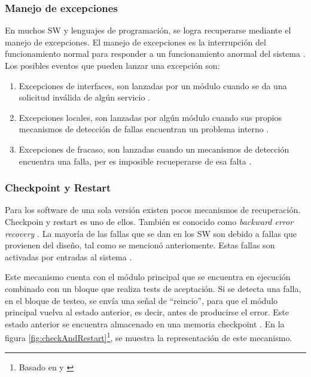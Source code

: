 \subsubsection{Manejo de excepciones}
En muchos \ac{SW} y lenguajes de programación, se logra recuperarse mediante el manejo de 
excepciones. El manejo de excepciones es la interrupción del funcionamiento normal para responder a 
un funcionamiento anormal del sistema \citep{SoftwareFaultToleranceATutorial}. Los posibles eventos 
que pueden lanzar una excepción son:
\begin{enumerate}
 \item Excepciones de interfaces, son lanzadas por un módulo cuando se da una solicitud inválida de 
algún servicio \citep{FTDesign}.
 \item Excepciones locales, son lanzadas por algún módulo cuando sus propios mecanismos de 
detección de fallas encuentran un problema interno \citep{FTDesign}.
 \item Excepciones de fracaso, son lanzadas cuando un mecanismos de detección encuentra una falla, 
per es imposible recueperarse de esa falta \citep{FTDesign}.
\end{enumerate}

\subsubsection{Checkpoint y Restart}
Para los software de una sola versión existen pocos mecanismos de recuperación. Checkpoin y restart 
es uno de ellos. También es conocido como \textit{backward error recovery} \citep{FTDesign}. La 
mayoría de las fallas que se dan en los \ac{SW} son debido a fallas que provienen del diseño, tal 
como se mencionó anteriomente. Estas fallas son activadas por entradas al sistema \citep{FTDesign}. 

Este mecanismo cuenta con el módulo principal que se encuentra en ejecución combinado con un bloque 
que realiza tests de aceptación. Si se detecta una falla, en el bloque de testeo, se envía una 
señal de ``reincio'', para que el módulo principal vuelva al estado anterior, es decir, antes de 
producirse el error. Este estado anterior se encuentra almacenado en una memoria checkpoint 
\citep{FTDesign}. En la figura \ref{fig:checkAndRestart}\footnote{Basado en \cite{FTDesign} y 
\cite{SoftwareFaultToleranceATutorial}}, se muestra la representación de este mecanismo.

